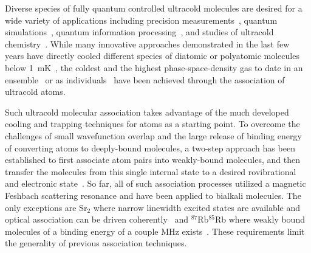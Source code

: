 \documentclass[aps,prl,twocolumn,superscriptaddress]{revtex4-1}
\begin{document}
Diverse species of fully quantum controlled  ultracold molecules are desired for a  wide variety of applications including precision measurements~\cite{Kondov2019,Nick_and_Ivan2017, PhysRevA.101.042504, Andreev2018, PhysRevLett.119.153001, hudson2011}, quantum simulations~\cite{Yao2018, Wall2015, Sundar2018, wall2015realizing}, quantum information processing~\cite{DeMille2002, Ni2018, Hudson2018, Lin2019}, and studies of ultracold chemistry~\cite{Bohn2017,Bala2016,Hu1111,Segev2019}.
While many innovative approaches demonstrated in the last few years have directly cooled different species of diatomic or polyatomic molecules below 1~mK~\cite{Norrgard2016,Anderegg2018, Mitra1366, PhysRevX.10.021049, PhysRevLett.121.013202, PhysRevLett.120.123201}, the coldest and the highest phase-space-density gas to date in an ensemble~\cite{Demarco2018} or as individuals~\cite{Zhang2020,He331}  have been achieved through the association of ultracold atoms.

Such ultracold molecular association takes advantage of the much developed cooling and trapping techniques for atoms as a starting point. To overcome the challenges of small wavefunction overlap and the large release of binding energy of converting atoms to deeply-bound molecules, a  two-step approach has been established to first associate atom pairs into weakly-bound molecules, and then transfer the molecules from this single internal state to a desired rovibrational and electronic state~\cite{Danzl2008, Ni2008,Lang2008, Takekoshi2014, Molony2014, Park2015, Guo2016, Kondov2019, Voges2020}.
So far, all of such association processes utilized a magnetic Feshbach scattering resonance and have been applied to bialkali molecules. The only exceptions are Sr$_2$ where narrow linewidth excited states are available and optical association can be driven coherently~\cite{Reinaudi2012,Stellmer2012} and $^{87}$Rb$^{85}$Rb where weakly bound molecules of a binding energy of a couple MHz exists~\cite{He331}. These requirements  limit the generality of previous association techniques.
\end{document}
